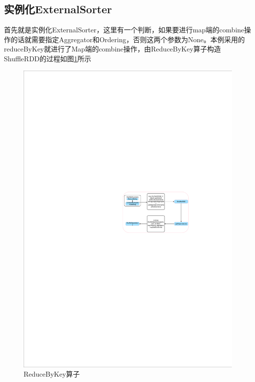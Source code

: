 \subsection{实例化ExternalSorter}
首先就是实例化ExternalSorter，这里有一个判断，如果要进行map端的combine操作的话就需要指定Aggregator和Ordering，否则这两个参数为None。本例采用的reduceByKey就进行了Map端的combine操作，由ReduceByKey算子构造ShuffleRDD的过程如图\ref{fig:instantiateExternalSorter}所示
\begin{figure}[H] 
	\centering
	\includegraphics[width=\textwidth]{figures/ReduceByKey.pdf}
	\caption{ReduceByKey算子}
	\label{fig:instantiateExternalSorter}
\end{figure}
